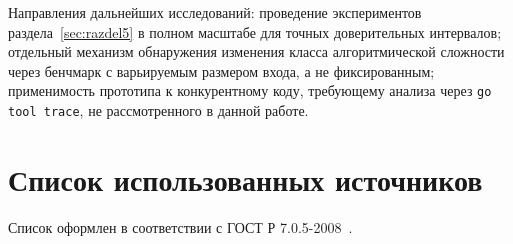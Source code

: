 \documentclass[12pt,a4paper]{article}
\newcommand{\newrazdel}{\clearpage}
\numberwithin{equation}{section}
\begin{document}
Направления дальнейших исследований: проведение экспериментов
раздела~\ref{sec:razdel5} в полном масштабе для точных доверительных
интервалов; отдельный механизм обнаружения изменения класса
алгоритмической сложности через бенчмарк с варьируемым размером входа, а
не фиксированным; применимость прототипа к конкурентному коду, требующему
анализа через \texttt{go tool trace}, не рассмотренного в данной работе.

\newrazdel
\section*{Список использованных источников}

Список оформлен в соответствии с ГОСТ Р 7.0.5-2008~\cite{gost7005}.
\end{document}
